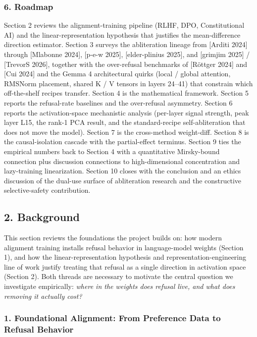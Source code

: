 \documentclass[
  11pt,
]{article}
\begin{document}
\subsubsection{6. Roadmap}\label{roadmap}

Section 2 reviews the alignment-training pipeline (RLHF, DPO,
Constitutional AI) and the linear-representation hypothesis that
justifies the mean-difference direction estimator. Section 3 surveys the
abliteration lineage from {[}Arditi 2024{]} through {[}Mlabonne 2024{]},
{[}p-e-w 2025{]}, {[}elder-plinius 2025{]}, and {[}grimjim 2025{]} /
{[}TrevorS 2026{]}, together with the over-refusal benchmarks of
{[}Röttger 2024{]} and {[}Cui 2024{]} and the Gemma 4 architectural
quirks (local / global attention, RMSNorm placement, shared K / V
tensors in layers 24--41) that constrain which off-the-shelf recipes
transfer. Section 4 is the mathematical framework. Section 5 reports the
refusal-rate baselines and the over-refusal asymmetry. Section 6 reports
the activation-space mechanistic analysis (per-layer signal strength,
peak layer L15, the rank-1 PCA result, and the standard-recipe
self-abliteration that does not move the model). Section 7 is the
cross-method weight-diff. Section 8 is the causal-isolation cascade with
the partial-effect terminus. Section 9 ties the empirical numbers back
to Section 4 with a quantitative Mirsky-bound connection plus discussion
connections to high-dimensional concentration and lazy-training
linearization. Section 10 closes with the conclusion and an ethics
discussion of the dual-use surface of abliteration research and the
constructive selective-safety contribution.

\subsection{2. Background}\label{background}

This section reviews the foundations the project builds on: how modern
alignment training installs refusal behavior in language-model weights
(Section 1), and how the linear-representation hypothesis and
representation-engineering line of work justify treating that refusal as
a single direction in activation space (Section 2). Both threads are
necessary to motivate the central question we investigate empirically:
\emph{where in the weights does refusal live, and what does removing it
actually cost?}

\subsubsection{1. Foundational Alignment: From Preference Data to
Refusal
Behavior}\label{foundational-alignment-from-preference-data-to-refusal-behavior}
\end{document}
